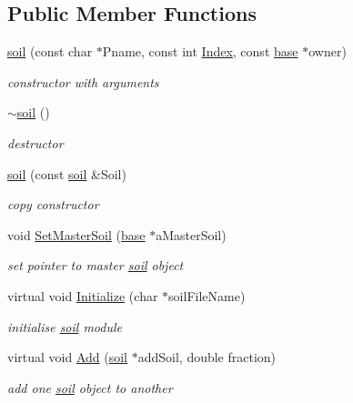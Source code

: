 \subsection*{Public Member Functions}
\begin{DoxyCompactItemize}
\item 
\hyperlink{classsoil_a289d10d074eff9162a03968bd9240ece}{soil} (const char $\ast$Pname, const int \hyperlink{classbase_afa59aaa1a0201700640234eb13a03aae}{Index}, const \hyperlink{classbase}{base} $\ast$owner)
\begin{DoxyCompactList}\small\item\em constructor with arguments \item\end{DoxyCompactList}\item 
\hyperlink{classsoil_a863db6f7a26049bcac60099234181765}{$\sim$soil} ()
\begin{DoxyCompactList}\small\item\em destructor \item\end{DoxyCompactList}\item 
\hyperlink{classsoil_a905aaf29599f8afceb8aa8f51a631def}{soil} (const \hyperlink{classsoil}{soil} \&Soil)
\begin{DoxyCompactList}\small\item\em copy constructor \item\end{DoxyCompactList}\item 
void \hyperlink{classsoil_a2f71cc22b24814c85b0a2b2c6e5c4a89}{SetMasterSoil} (\hyperlink{classbase}{base} $\ast$aMasterSoil)
\begin{DoxyCompactList}\small\item\em set pointer to master \hyperlink{classsoil}{soil} object \item\end{DoxyCompactList}\item 
virtual void \hyperlink{classsoil_ae5f6d74641b63e3c8bd9519bd7ca757c}{Initialize} (char $\ast$soilFileName)
\begin{DoxyCompactList}\small\item\em initialise \hyperlink{classsoil}{soil} module \item\end{DoxyCompactList}\item 
virtual void \hyperlink{classsoil_a3902dd1ec4cec0229854d26d0f3dbc14}{Add} (\hyperlink{classsoil}{soil} $\ast$addSoil, double fraction)
\begin{DoxyCompactList}\small\item\em add one \hyperlink{classsoil}{soil} object to another \item\end{DoxyCompactList}\item 

\end{DoxyCompactItemize}

